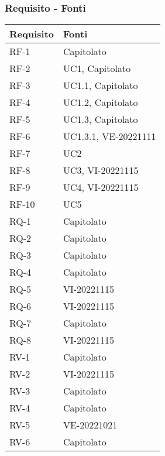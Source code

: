 \subsubsection{Requisito - Fonti}
\begin{table}[h]
	\centering
	\begin{tabular}{| p{} | p{} |} 
		\hline
		\textbf{Requisito} & \textbf{Fonti} \\
		\hline
		RF-1 & Capitolato\\
		\hline
		RF-2 & UC1, Capitolato\\
		\hline
		RF-3 & UC1.1, Capitolato\\
		\hline
		RF-4 & UC1.2, Capitolato\\
		\hline
		RF-5 & UC1.3, Capitolato\\
		\hline
		RF-6 & UC1.3.1, VE-20221111\\
		\hline
		RF-7 & UC2\\
		\hline
		RF-8 & UC3, VI-20221115\\
		\hline
		RF-9 & UC4, VI-20221115\\
		\hline
		RF-10 & UC5\\
		\hline
		RQ-1 & Capitolato\\
		\hline
		RQ-2 & Capitolato\\
		\hline
		RQ-3 & Capitolato\\
		\hline
		RQ-4 & Capitolato\\
		\hline
		RQ-5 & VI-20221115\\
		\hline
		RQ-6 & VI-20221115\\
		\hline
		RQ-7 & Capitolato\\
		\hline
		RQ-8 & VI-20221115\\
		\hline
		RV-1 & Capitolato\\
		\hline
		RV-2 & VI-20221115\\
		\hline
		RV-3 & Capitolato\\
		\hline
		RV-4 & Capitolato\\
		\hline
		RV-5 & VE-20221021\\
		\hline
		RV-6 & Capitolato\\
		\hline
	\end{tabular}
\end{table}

